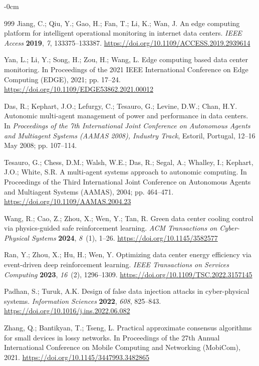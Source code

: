 \documentclass[smartcities,article,submit,moreauthors]{Definitions/mdpi}
\begin{document}
\begin{adjustwidth}{-\extralength}{0cm}
\begin{thebibliography}{999}
Jiang, C.; Qiu, Y.; Gao, H.; Fan, T.; Li, K.; Wan, J. An edge computing
platform for intelligent operational monitoring in internet data centers.
\emph{IEEE Access} \textbf{2019}, \emph{7}, 133375--133387.
\url{https://doi.org/10.1109/ACCESS.2019.2939614}

Yan, L.; Li, Y.; Song, H.; Zou, H.; Wang, L. Edge computing based data center
monitoring. In Proceedings of the 2021 IEEE International Conference on Edge
Computing (EDGE), 2021; pp. 17--24.
\url{https://doi.org/10.1109/EDGE53862.2021.00012}

Das, R.; Kephart, J.O.; Lefurgy, C.; Tesauro, G.; Levine, D.W.; Chan, H.Y.
Autonomic multi-agent management of power and performance in data centers.
In \emph{Proceedings of the 7th International Joint Conference on Autonomous
Agents and Multiagent Systems (AAMAS 2008), Industry Track}, Estoril, Portugal,
12--16 May 2008; pp. 107--114.

Tesauro, G.; Chess, D.M.; Walsh, W.E.; Das, R.; Segal, A.; Whalley, I.;
Kephart, J.O.; White, S.R. A multi-agent systems approach to autonomic
computing. In Proceedings of the Third International Joint Conference on
Autonomous Agents and Multiagent Systems (AAMAS), 2004; pp. 464--471.
\url{https://doi.org/10.1109/AAMAS.2004.23}

Wang, R.; Cao, Z.; Zhou, X.; Wen, Y.; Tan, R. Green data center cooling
control via physics-guided safe reinforcement learning. \emph{ACM Transactions
on Cyber-Physical Systems} \textbf{2024}, \emph{8}~(1), 1--26.
\url{https://doi.org/10.1145/3582577}

Ran, Y.; Zhou, X.; Hu, H.; Wen, Y. Optimizing data center energy efficiency
via event-driven deep reinforcement learning. \emph{IEEE Transactions on
Services Computing} \textbf{2023}, \emph{16}~(2), 1296--1309.
\url{https://doi.org/10.1109/TSC.2022.3157145}

Padhan, S.; Turuk, A.K. Design of false data injection attacks in
cyber-physical systems. \emph{Information Sciences} \textbf{2022}, \emph{608},
825--843.
\url{https://doi.org/10.1016/j.ins.2022.06.082}

Zhang, Q.; Bantikyan, T.; Tseng, L. Practical approximate consensus algorithms
for small devices in lossy networks. In Proceedings of the 27th Annual
International Conference on Mobile Computing and Networking (MobiCom), 2021.
\url{https://doi.org/10.1145/3447993.3482865}


\end{thebibliography}
\end{adjustwidth}
\end{document}
